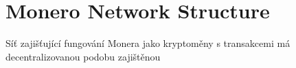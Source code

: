 \documentclass[
  printed, %
  table,   %
  nolof,     %
  nolot,     %
           oneside, color
]{fithesis3}
\begin{document}
\section{Monero Network Structure}
Síť zajišťující fungování Monera jako kryptoměny s transakcemi má decentralizovanou podobu zajištěnou 


\end{document}
